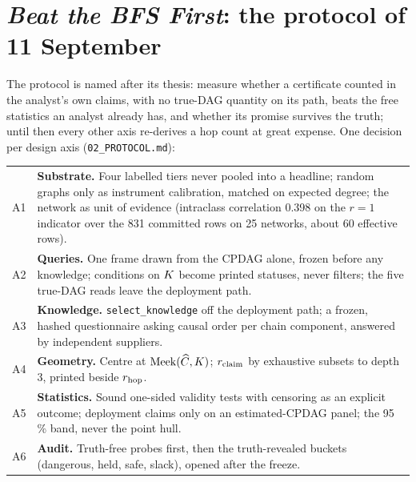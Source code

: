 \begin{antes}
\end{antes}

\section{\emph{Beat the BFS First}: the protocol of 11 September}

The protocol is named after its thesis: measure whether a certificate counted in the analyst's own claims, with no true-DAG quantity
on its path, beats the free statistics an analyst already has, and whether its promise survives the truth; until then every other axis
re-derives a hop count at great expense. One decision per design axis (\texttt{02\_PROTOCOL.md}):

\begin{center}\small
\begin{tabular}{@{}p{0.5cm}p{13.3cm}@{}}
\toprule
A1 & \textbf{Substrate.} Four labelled tiers never pooled into a headline; random graphs only as instrument calibration, matched on
expected degree; the network as unit of evidence (intraclass correlation 0.398 on the $r = 1$ indicator over the 831 committed rows on 25 networks, about 60 effective rows). \\
A2 & \textbf{Queries.} One frame drawn from the CPDAG alone, frozen before any knowledge; conditions on $K$ become printed statuses,
never filters; the five true-DAG reads leave the deployment path. \\
A3 & \textbf{Knowledge.} \texttt{select\_knowledge} off the deployment path; a frozen, hashed questionnaire asking causal order per
chain component, answered by independent suppliers. \\
A4 & \textbf{Geometry.} Centre at $\mathrm{Meek}(\widehat{C}, K)$; $r_{\mathrm{claim}}$ by exhaustive subsets to depth 3, printed beside $r_{\mathrm{hop}}$. \\
A5 & \textbf{Statistics.} Sound one-sided validity tests with censoring as an explicit outcome; deployment claims only on an
estimated-CPDAG panel; the 95\,\% band, never the point hull. \\
A6 & \textbf{Audit.} Truth-free probes first, then the truth-revealed buckets (dangerous, held, safe, slack), opened after the freeze. \\
\bottomrule
\end{tabular}
\end{center}

